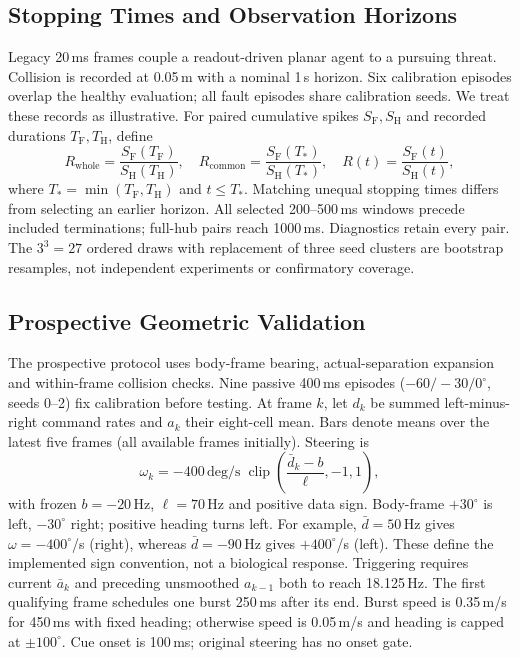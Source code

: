 \subsection{Stopping Times and Observation Horizons}
Legacy 20\,ms frames couple a readout-driven planar agent to a pursuing threat. Collision is recorded at 0.05\,m with a nominal 1\,s horizon. Six calibration episodes overlap the healthy evaluation; all fault episodes share calibration seeds. We treat these records as illustrative. For paired cumulative spikes $S_{\mathrm F},S_{\mathrm H}$ and recorded durations $T_{\mathrm F},T_{\mathrm H}$, define
\begin{equation}
R_{\mathrm{whole}}=\frac{S_{\mathrm F}(T_{\mathrm F})}{S_{\mathrm H}(T_{\mathrm H})},\quad
R_{\mathrm{common}}=\frac{S_{\mathrm F}(T_*)}{S_{\mathrm H}(T_*)},\quad
R(t)=\frac{S_{\mathrm F}(t)}{S_{\mathrm H}(t)},
\end{equation}
where $T_*=\min(T_{\mathrm F},T_{\mathrm H})$ and $t\leq T_*$. Matching unequal stopping times differs from selecting an earlier horizon. All selected 200--500\,ms windows precede included terminations; full-hub pairs reach 1000\,ms. Diagnostics retain every pair. The $3^3=27$ ordered draws with replacement of three seed clusters are bootstrap resamples, not independent experiments or confirmatory coverage.

\subsection{Prospective Geometric Validation}
The prospective protocol uses body-frame bearing, actual-separation expansion and within-frame collision checks. Nine passive 400\,ms episodes ($-60/-30/0^\circ$, seeds 0--2) fix calibration before testing. At frame $k$, let $d_k$ be summed left-minus-right command rates and $a_k$ their eight-cell mean. Bars denote means over the latest five frames (all available frames initially). Steering is
\begin{equation}
\omega_k=-400\,\mathrm{deg/s}\;\operatorname{clip}\!\left(\frac{\bar d_k-b}{\ell},-1,1\right),
\label{eq:steering}
\end{equation}
with frozen $b=-20$\,Hz, $\ell=70$\,Hz and positive data sign. Body-frame $+30^\circ$ is left, $-30^\circ$ right; positive heading turns left. For example, $\bar d=50$\,Hz gives $\omega=-400^\circ$/s (right), whereas $\bar d=-90$\,Hz gives $+400^\circ$/s (left). These define the implemented sign convention, not a biological response. Triggering requires current $\bar a_k$ and preceding unsmoothed $a_{k-1}$ both to reach 18.125\,Hz. The first qualifying frame schedules one burst 250\,ms after its end. Burst speed is 0.35\,m/s for 450\,ms with fixed heading; otherwise speed is 0.05\,m/s and heading is capped at $\pm100^\circ$. Cue onset is 100\,ms; original steering has no onset gate.

